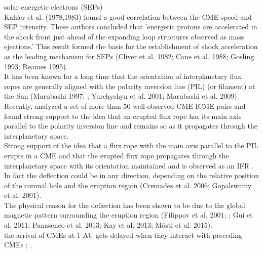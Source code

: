 solar energetic electrons (SEPs)\\
Kahler et al. (1978,1983) found a good correlation between the CME speed and SEP intensity. These authors concluded that 'energetic protons are accelerated in the shock front just ahead of the expanding loop structures observed as mass ejections.' This result formed the basis for the establishment of shock acceleration as the leading mechanism for SEPs (Cliver et al. 1982; Cane et al. 1988; Gosling 1993; Reames 1995).\\


It has been known for a long time that the orientation of interplanetary flux ropes are generally aligned with the polarity inversion line (PIL) (or filament) at the Sun (Marubashi 1997; \citep{Bothmer1998}; Yurchyshyn et al. 2001; Marubashi et al. 2009).\\
Recently, \citet{Marubashi2015} analyzed a set of more than 50 well observed CME-ICME pairs and found strong support to the idea that an erupted flux rope has its main axis parallel to the polarity inversion line and remains so as it propagates through the interplanetary space.\\
Strong support of the idea that a flux rope with the main axis parallel to the PIL erupts in a CME and that the erupted flux rope propagates through the interplanetary space with its orientation maintained and is observed as an IFR \citep{Marubashi2015}.\\


In fact the deflection could be in any direction, depending on the relative position of the coronal hole and the eruption region (Cremades et al. 2006; Gopalswamy et al. 2001).\\
The physical reason for the deflection has been shown to be due to the global magnetic pattern surrounding the eruption region (Filippov et al. 2001; \citep{Sterling2011}; Gui et al. 2011; Panasenco et al. 2013; Kay et al. 2013; Möstl et al. 2015).\\


the arrival of CMEs at 1 AU gets delayed when they interact with preceding CMEs \citep{Manoharan2004}; \citep{Temmer2012}.\\





